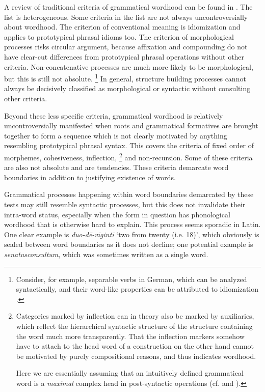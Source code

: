 \documentclass[a4paper, oneside, 12pt]{report}
\newcommand*{\citepages}[1]{pp.~{#1}}
\newcommand{\form}[1]{\emph{#1}}
\newcommand{\translate}[1]{`#1'}
\begin{document}
A review of traditional criteria of grammatical wordhood can be found in \citet[\citepages{12-19}]{dixon2012basic3}.
The list is heterogeneous.
Some criteria in the list are not always uncontroversially about wordhood.
The criterion of conventional meaning is idiomization and applies to prototypical phrasal idioms too.
The criterion of morphological processes risks circular argument,
because affixation and compounding do not have clear-cut differences from prototypical phrasal operations without other criteria.
Non-concatenative processes are much more likely to be morphological,
but this is still not absolute.%
\footnote{
    Consider, for example, separable verbs in German, 
    which can be analyzed syntactically, and their word-like properties can be attributed to idiomization \citep{wurmbrand2000structure,muller2002complex}.
}
In general, structure building processes cannot always be decisively classified as morphological or syntactic without consulting other criteria.

Beyond these less specific criteria, grammatical wordhood is relatively uncontroversially manifested when roots and grammatical formatives are brought together to form a sequence which is not clearly motivated by anything resembling prototypical phrasal syntax.
This covers the criteria of fixed order of morphemes, cohesiveness, inflection,%
\footnote{
    Categories marked by inflection can in theory also be marked by auxiliaries,
    which reflect the hierarchical syntactic structure of the structure containing the word much more transparently.
    That the inflection markers somehow have to attach to the head word of a construction on the other hand cannot be motivated by purely compositional reasons,
    and thus indicates wordhood.

    Here we are essentially assuming that an intuitively defined grammatical word is a \emph{maximal} complex head in post-syntactic operations (cf. \citealt{embick2007linearization} and \citealt{bruening2018lexicalist}).
}
and non-recursion.
Some of these criteria are also not absolute and are tendencies.
These criteria demarcate word boundaries in addition to justifying existence of words.

Grammatical processes happening within word boundaries demarcated by these tests may still resemble syntactic processes,
but this does not invalidate their intra-word status, especially when the form in question has phonological wordhood that is otherwise hard to explain.
This process seems sporadic in Latin.
One clear example is \form{duo-dē-vīgintī} \translate{two from twenty (i.e. 18)},
which obviously is sealed between word boundaries as it does not decline;
one potential example is \form{senatusconsultum}, which was sometimes written as a single word. 
\end{document}
